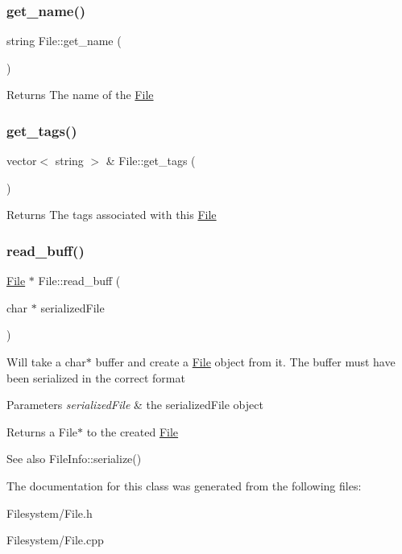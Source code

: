 \subsubsection{\texorpdfstring{get\+\_\+name()}{get\_name()}}
{\footnotesize\ttfamily string File\+::get\+\_\+name (\begin{DoxyParamCaption}{ }\end{DoxyParamCaption})}

\begin{DoxyReturn}{Returns}
The name of the \mbox{\hyperlink{classFile}{File}} 
\end{DoxyReturn}
\mbox{\label{classFile_a479270bfe1fa436d317151ac108eb28a}} 
\subsubsection{\texorpdfstring{get\+\_\+tags()}{get\_tags()}}
{\footnotesize\ttfamily vector$<$ string $>$ \& File\+::get\+\_\+tags (\begin{DoxyParamCaption}{ }\end{DoxyParamCaption})}

\begin{DoxyReturn}{Returns}
The tags associated with this \mbox{\hyperlink{classFile}{File}} 
\end{DoxyReturn}
\mbox{\label{classFile_abd409818fbd7f3a2319f2b27a62c8ccd}} 
\subsubsection{\texorpdfstring{read\+\_\+buff()}{read\_buff()}}
{\footnotesize\ttfamily \mbox{\hyperlink{classFile}{File}} $\ast$ File\+::read\+\_\+buff (\begin{DoxyParamCaption}\item[{char $\ast$}]{serialized\+File }\end{DoxyParamCaption})\hspace{0.3cm}{\ttfamily [static]}}

Will take a char$\ast$ buffer and create a \mbox{\hyperlink{classFile}{File}} object from it. The buffer must have been serialized in the correct format 
\begin{DoxyParams}{Parameters}
{\em serialized\+File} & the serialized\+File object \\
\hline
\end{DoxyParams}
\begin{DoxyReturn}{Returns}
a File$\ast$ to the created \mbox{\hyperlink{classFile}{File}} 
\end{DoxyReturn}
\begin{DoxySeeAlso}{See also}
File\+Info\+::serialize() 
\end{DoxySeeAlso}


The documentation for this class was generated from the following files\+:\begin{DoxyCompactItemize}
\item 
Filesystem/File.\+h\item 
Filesystem/File.\+cpp\end{DoxyCompactItemize}
